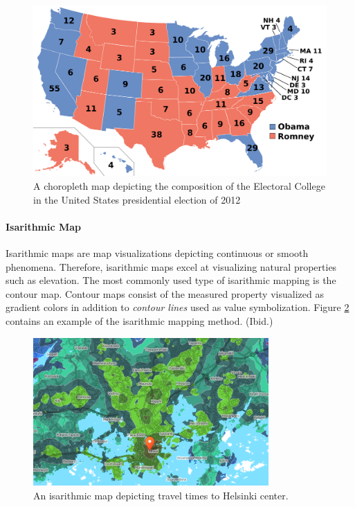 \begin{figure}[htbp]
  \begin{center}
    \includegraphics[width=12cm]{images/choropleth-example.png}
    \caption{A choropleth map depicting the composition of the Electoral College in the United States presidential election of 2012 \citep{skidmore_electoral_2012}}
    \label{fig:choropleth}
  \end{center}
\end{figure}

\paragraph{Isarithmic Map}

Isarithmic maps are map visualizations depicting continuous or smooth phenomena. Therefore, isarithmic maps excel at visualizing natural properties such as elevation. The most commonly used type of isarithmic mapping is the contour map. Contour maps consist of the measured property visualized as gradient colors in addition to \emph{contour lines} used as value symbolization. Figure \ref{fig:isarithmic} contains an example of the isarithmic mapping method. (Ibid.)

\begin{figure}[htbp]
  \begin{center}
    \includegraphics[width=9cm]{images/isarithmic-example.png}
    \caption{An isarithmic map depicting travel times to Helsinki center. \citep{hsl_matka-aikakartta_2014}}
    \label{fig:isarithmic}
  \end{center}
\end{figure}

